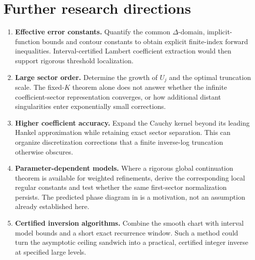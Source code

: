 \documentclass[11pt]{article}
\numberwithin{equation}{section}
\theoremstyle{remark}\newtheorem{remark}[theorem]{Remark}
\begin{document}
\section{Further research directions}\label{peo:sec:questions}
\begin{enumerate}[leftmargin=*,itemsep=0.4em]
\item \textbf{Effective error constants.} Quantify the common $\Delta$-domain, implicit-function bounds and contour constants to obtain explicit finite-index forward inequalities. Interval-certified Lambert coefficient extraction would then support rigorous threshold localization.
\item \textbf{Large sector order.} Determine the growth of $U_j$ and the optimal truncation scale. The fixed-$K$ theorem alone does not answer whether the infinite coefficient-sector representation converges, or how additional distant singularities enter exponentially small corrections.
\item \textbf{Higher coefficient accuracy.} Expand the Cauchy kernel beyond its leading Hankel approximation while retaining exact sector separation. This can organize discretization corrections that a finite inverse-log truncation otherwise obscures.
\item \textbf{Parameter-dependent models.} Where a rigorous global continuation theorem is available for weighted refinements, derive the corresponding local regular constants and test whether the same first-sector normalization persists. The predicted phase diagram in \cite{refined} is a motivation, not an assumption already established here.
\item \textbf{Certified inversion algorithms.} Combine the smooth chart with interval model bounds and a short exact recurrence window. Such a method could turn the asymptotic ceiling sandwich into a practical, certified integer inverse at specified large levels.
\end{enumerate}
\end{document}
